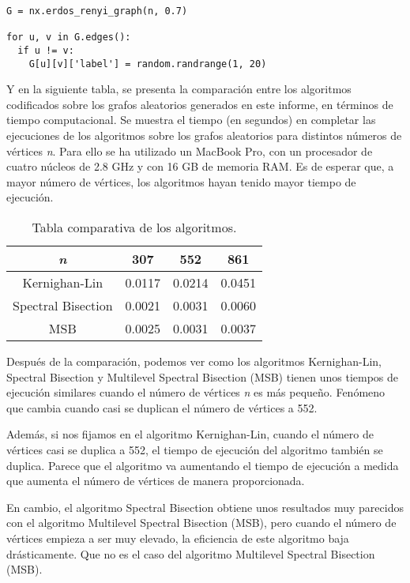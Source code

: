 \lstset{language=Python}    
\begin{lstlisting}[frame=single]  
G = nx.erdos_renyi_graph(n, 0.7)

for u, v in G.edges():
  if u != v:
    G[u][v]['label'] = random.randrange(1, 20)
\end{lstlisting}

Y en la siguiente tabla, se presenta la comparación entre los algoritmos codificados sobre los grafos aleatorios generados en este informe, en términos de tiempo computacional. Se muestra el tiempo (en segundos) en completar las ejecuciones de los algoritmos sobre los grafos aleatorios para distintos números de vértices \textit{n}. Para ello se ha utilizado un MacBook Pro, con un procesador de cuatro núcleos de 2.8 GHz y con 16 GB de memoria RAM. Es de esperar que, a mayor número de vértices, los algoritmos hayan tenido mayor tiempo de ejecución.

\renewcommand{\tablename}{Tabla}
\begin{table}[h]	
	\begin{center}
		\begin{tabular}{|c|c|c|c|}
			\hline
			\textit{n} & 307 & 552 & 861 \\
			\hline
			Kernighan-Lin & 0.0117 & 0.0214 & 0.0451\\
			\hline
			Spectral Bisection & 0.0021 & 0.0031 & 0.0060 \\
			\hline
			MSB & 0.0025 & 0.0031 & 0.0037 \\ 
			\hline
		\end{tabular}
		\vspace{3mm}
		\caption{Tabla comparativa de los algoritmos.}
	\end{center}
\end{table}

Después de la comparación, podemos ver como los algoritmos Kernighan-Lin, Spectral Bisection y Multilevel Spectral Bisection (MSB) tienen unos tiempos de ejecución similares cuando el número de vértices \textit{n} es más pequeño. Fenómeno que cambia cuando casi se duplican el número de vértices a 552. 

\newpage
Además, si nos fijamos en el algoritmo Kernighan-Lin, cuando el número de vértices casi se duplica a 552, el tiempo de ejecución del algoritmo también se duplica. Parece que el algoritmo va aumentando el tiempo de ejecución a medida que aumenta el número de vértices de manera proporcionada.

En cambio, el algoritmo Spectral Bisection obtiene unos resultados muy parecidos con el algoritmo Multilevel Spectral Bisection (MSB), pero cuando el número de vértices empieza a ser muy elevado, la eficiencia de este algoritmo baja drásticamente. Que no es el caso del algoritmo Multilevel Spectral Bisection (MSB).

